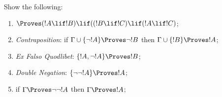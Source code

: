 \documentclass[../../include/open-logic-section]{subfiles}
\begin{document}
\begin{prob}
  Show the following:
\begin{enumerate}
\item $\Proves (!A \lif !B) \lif ((!B \lif !C)
  \lif (!A \lif !C)$; 
\item \emph{Contraposition}: if $\Gamma \cup \{ \lnot !A\}
  \Proves \lnot !B$ then $\Gamma \cup \{ !B\} \Proves
  !A$; 
\item \emph{Ex Falso Quodlibet}: $\{ !A, \lnot!A\} \Proves
    !B$; 
\item \emph{Double Negation}: $\{ \lnot\lnot!A\} \Proves
  !A$;
\item if $\Gamma \Proves \lnot\lnot!A$ then $\Gamma \Proves
  !A$;
\end{enumerate}
\end{prob}
\end{document}
